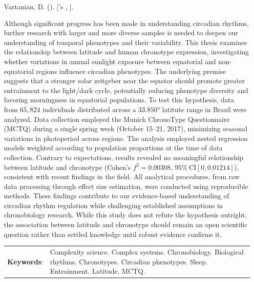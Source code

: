 \documentclass[
12pt,
openright,
oneside,
a4paper,
chapter=TITLE,
section=TITLE,
french,
spanish,
brazil,
english
]{abntex2}
\renewcommand{\resumoname}{Abstract}
\renewcommand{\resumoname}{Resumo}
\renewcommand{\resumoname}{Resumen}
\renewcommand{\resumoname}{Résumé}
\providecommand{\imprimiruniversidade}{}
\providecommand{\imprimirtipodetituloacademico}{}
\newenvironment{resumoenv}[1][\resumoname]{
  \pretextualchapter{#1}
  \begingroup
  \setlength{\parindent}{0cm}
  \setlength{\parskip}{\smallskipamount} %
  \AtBeginEnvironment{tabular}{\normalsize}
  \renewcommand{\arraystretch}{1}
  \setlength{\aboverulesep}{0ex}
  \setlength{\belowrulesep}{0ex}
  \setlength{\arrayrulewidth}{0pt}
  \setlength{\tabcolsep}{0cm}
  \vspace{-\smallskipamount} %
  \begin{SingleSpace}
}{
  \end{SingleSpace}
  \cleardoublepage
  \endgroup
}
\renewcommand{\arraystretch}{1.5}
\begin{document}
\begin{resumoenv}[\resumoname]
Vartanian, D. ({\imprimirdata}). \textit{\imprimirtitulo} [{\imprimirtipodetituloacademico}'s {\imprimirtipotrabalho}, {\imprimiruniversidade}].


Although significant progress has been made in understanding circadian
rhythms, further research with larger and more diverse samples is needed
to deepen our understanding of temporal phenotypes and their
variability. This thesis examines the relationship between latitude and
human chronotype expression, investigating whether variations in annual
sunlight exposure between equatorial and non-equatorial regions
influence circadian phenotypes. The underlying premise suggests that a
stronger solar zeitgeber near the equator should promote greater
entrainment to the light/dark cycle, potentially reducing phenotype
diversity and favoring morningness in equatorial populations. To test
this hypothesis, data from \(65,824\) individuals distributed across a
\(33.850°\) latitute range in Brazil were analyzed. Data collection
employed the Munich ChronoType Questionnaire (MCTQ) during a single
spring week (October 15--21, 2017), minimizing seasonal variations in
photoperiod across regions. The analysis employed nested regression
models weighted according to population proportions at the time of data
collection. Contrary to expectations, results revealed no meaningful
relationship between latitude and chronotype (Cohen's \(f^2 = 0.00308\),
\(95\% \ \text{CI}[0, 0.01214]\)), consistent with recent findings in
the field. All analytical procedures, from raw data processing through
effect size estimation, were conducted using reproducible methods. These
findings contribute to our evidence-based understanding of circadian
rhythm regulation while challenging established assumptions in
chronobiology research. While this study does not refute the hypothesis
outright, the association between latitude and chronotype should remain
an open scientific question rather than settled knowledge until robust
evidence confirms it.


\begin{tabular}{p{2.5cm} p{13.4cm}}
  \textbf{Keywords}: & Complexity science. Complex systems. Chronobiology. Biological rhythms. Chronotypes. Circadian phenotypes. Sleep. Entrainment. Latitude. MCTQ.
\end{tabular}
\end{resumoenv}
\end{document}
